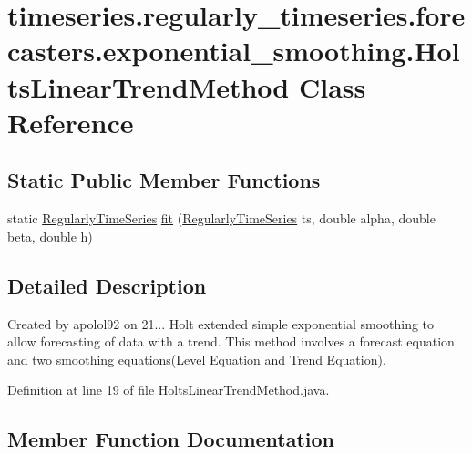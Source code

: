 \hypertarget{classtimeseries_1_1regularly__timeseries_1_1forecasters_1_1exponential__smoothing_1_1_holts_linear_trend_method}{}\section{timeseries.\+regularly\+\_\+timeseries.\+forecasters.\+exponential\+\_\+smoothing.\+Holts\+Linear\+Trend\+Method Class Reference}
\label{classtimeseries_1_1regularly__timeseries_1_1forecasters_1_1exponential__smoothing_1_1_holts_linear_trend_method}
\subsection*{Static Public Member Functions}
\begin{DoxyCompactItemize}
\item 
static \hyperlink{classtimeseries_1_1_regularly_time_series}{Regularly\+Time\+Series} \hyperlink{classtimeseries_1_1regularly__timeseries_1_1forecasters_1_1exponential__smoothing_1_1_holts_linear_trend_method_acd7a5ae2ad7b4102105cef5c17c5a0a4}{fit} (\hyperlink{classtimeseries_1_1_regularly_time_series}{Regularly\+Time\+Series} ts, double alpha, double beta, double h)
\end{DoxyCompactItemize}


\subsection{Detailed Description}
Created by apolol92 on 21... Holt extended simple exponential smoothing to allow forecasting of data with a trend. This method involves a forecast equation and two smoothing equations(\+Level Equation and Trend Equation). 

Definition at line 19 of file Holts\+Linear\+Trend\+Method.\+java.



\subsection{Member Function Documentation}
\hypertarget{classtimeseries_1_1regularly__timeseries_1_1forecasters_1_1exponential__smoothing_1_1_holts_linear_trend_method_acd7a5ae2ad7b4102105cef5c17c5a0a4}{}
